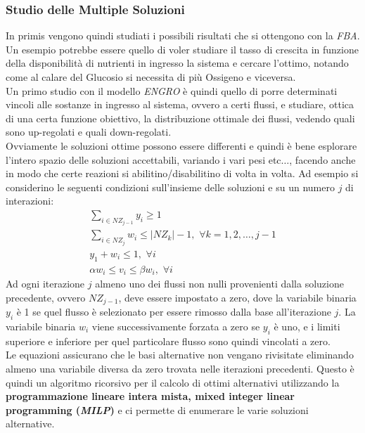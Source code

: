 \documentclass[a4paper,12pt, oneside]{book}
\begin{document}
\subsubsection{Studio delle Multiple Soluzioni}
In primis vengono quindi studiati i possibili risultati che si ottengono con la
\textit{FBA}. Un esempio potrebbe essere quello di voler studiare il tasso di
crescita in funzione della disponibilità di nutrienti in ingresso la sistema e
cercare l'ottimo, notando come al calare del Glucosio si necessita di più
Ossigeno e viceversa.\\
Un primo studio con il modello \textit{ENGRO} è quindi quello di porre
determinati vincoli alle sostanze in ingresso al sistema, ovvero a certi flussi,
e studiare, ottica di una certa funzione obiettivo, la distribuzione ottimale
dei flussi, vedendo quali sono up-regolati e quali down-regolati. \\
Ovviamente le soluzioni ottime possono essere differenti e quindi è bene
esplorare l'intero spazio delle soluzioni accettabili, variando i vari pesi
etc$\ldots$, facendo anche in modo che certe reazioni si abilitino/disabilitino
di volta in volta. Ad esempio si considerino le seguenti condizioni
sull'insieme delle soluzioni e su un numero $j$ di interazioni:
\begin{gather*}
  \sum_{i\in NZ_{j-1}} y_i\geq 1\\
  \sum_{i\in NZ_{j}} w_i\leq |NZ_k|-1,\,\,\forall k = 1,2,\ldots,j-1\\
  y_1+w_i\leq 1,\,\,\forall i\\
  \alpha w_i\leq v_i\leq \beta w_i,\,\,\forall i
\end{gather*}
Ad ogni iterazione $j$ almeno uno dei flussi non nulli provenienti dalla
soluzione precedente, ovvero $NZ_{j-1}$, deve essere impostato a zero, dove la
variabile binaria $y_i$ 
è 1 se quel flusso è selezionato per essere rimosso dalla base all'iterazione
$j$. La variabile binaria $w_i$ viene successivamente forzata a zero se $y_i$ è
uno, e i limiti superiore e inferiore per quel particolare flusso sono quindi
vincolati a zero.\\
Le equazioni assicurano che le basi alternative non vengano rivisitate
eliminando almeno una variabile diversa da zero trovata nelle iterazioni
precedenti. Questo è quindi un algoritmo ricorsivo per il calcolo di ottimi
alternativi utilizzando la \textbf{programmazione lineare intera mista, mixed
integer linear programming (\textit{MILP})} e ci permette di enumerare le varie
soluzioni alternative.
\end{document}
